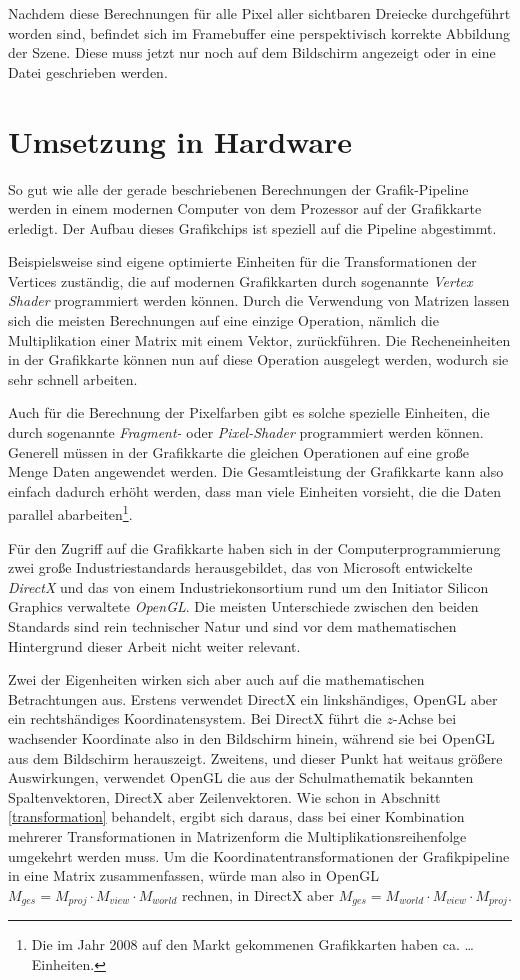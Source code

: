 Nachdem diese Berechnungen für alle Pixel aller sichtbaren Dreiecke durchgeführt worden sind, befindet sich im Framebuffer eine perspektivisch korrekte Abbildung der Szene. Diese muss jetzt nur noch auf dem Bildschirm angezeigt oder in eine Datei geschrieben werden.

\section{Umsetzung in Hardware}
So gut wie alle der gerade beschriebenen Berechnungen der Grafik-Pipeline werden in einem modernen Computer von dem Prozessor auf der Grafikkarte erledigt. Der Aufbau dieses Grafikchips ist speziell auf die Pipeline abgestimmt.

Beispielsweise sind eigene optimierte Einheiten für die Transformationen der Vertices zuständig, die auf modernen Grafikkarten durch sogenannte \emph{Vertex Shader} programmiert werden können. Durch die Verwendung von Matrizen lassen sich die meisten Berechnungen auf eine einzige Operation, nämlich die Multiplikation einer Matrix mit einem Vektor, zurückführen. Die Recheneinheiten in der Grafikkarte können nun auf diese Operation ausgelegt werden, wodurch sie sehr schnell arbeiten.

Auch für die Berechnung der Pixelfarben gibt es solche spezielle Einheiten, die durch sogenannte \emph{Fragment-} oder \emph{Pixel-Shader} programmiert werden können. Generell müssen in der Grafikkarte die gleichen Operationen auf eine große Menge Daten angewendet werden. Die Gesamtleistung der Grafikkarte kann also einfach dadurch erhöht werden, dass man viele Einheiten vorsieht, die die Daten parallel abarbeiten\footnote{Die im Jahr 2008 auf den Markt gekommenen Grafikkarten haben ca. \dots Einheiten.}.

\label{direct3dopengl}
Für den Zugriff auf die Grafikkarte haben sich in der Computerprogrammierung zwei große Industriestandards herausgebildet, das von Microsoft entwickelte \emph{DirectX} und das von einem Industriekonsortium rund um den Initiator Silicon Graphics verwaltete \emph{OpenGL}. Die meisten Unterschiede zwischen den beiden Standards sind rein technischer Natur und sind vor dem mathematischen Hintergrund dieser Arbeit nicht weiter relevant.

Zwei der Eigenheiten wirken sich aber auch auf die mathematischen Betrachtungen aus. Erstens verwendet DirectX ein linkshändiges, OpenGL aber ein rechtshändiges Koordinatensystem. Bei DirectX führt die $z$-Achse bei wachsender Koordinate also in den Bildschirm hinein, während sie bei OpenGL aus dem Bildschirm herauszeigt. Zweitens, und dieser Punkt hat weitaus größere Auswirkungen, verwendet OpenGL die aus der Schulmathematik bekannten Spaltenvektoren, DirectX aber Zeilenvektoren. Wie schon in Abschnitt \ref{transformation} behandelt, ergibt sich daraus, dass bei einer Kombination mehrerer Transformationen in Matrizenform die Multiplikationsreihenfolge umgekehrt werden muss. Um die Koordinatentransformationen der Grafikpipeline in eine Matrix zusammenfassen, würde man also in OpenGL $M_{ges} = M_{proj} \cdot M_{view} \cdot M_{world}$ rechnen, in DirectX aber $M_{ges} = M_{world} \cdot M_{view} \cdot M_{proj}$.

